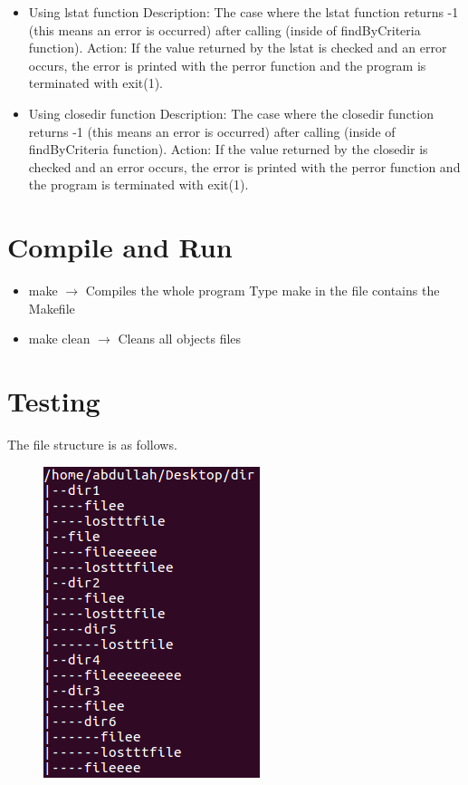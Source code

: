 \documentclass{article}
\begin{document}
\begin{itemize}
\item Using lstat function
\newline
Description: The case where the lstat function returns -1 (this means an error is occurred) after calling (inside of findByCriteria function).
\newline
Action: If the value returned by the lstat is checked and an error occurs, the error is printed with the perror function and the program is terminated with exit(1).
\item Using closedir function
\newline
Description: The case where the closedir function returns -1 (this means an error is occurred) after calling (inside of findByCriteria function).
\newline
Action: If the value returned by the closedir is checked and an error occurs, the error is printed with the perror function and the program is terminated with exit(1).
\end{itemize}

\section{Compile and Run}

\begin{itemize}
    \item make $\rightarrow$ Compiles the whole program
    \newline
    Type make in the file contains the Makefile
    \item make clean $\rightarrow$ Cleans all objects files
\end{itemize}

\section{Testing}

The file structure is as follows.
\begin{figure}[h]
	\centering
	\includegraphics[scale=0.5]{t1.png}
\end{figure}
\end{document}

